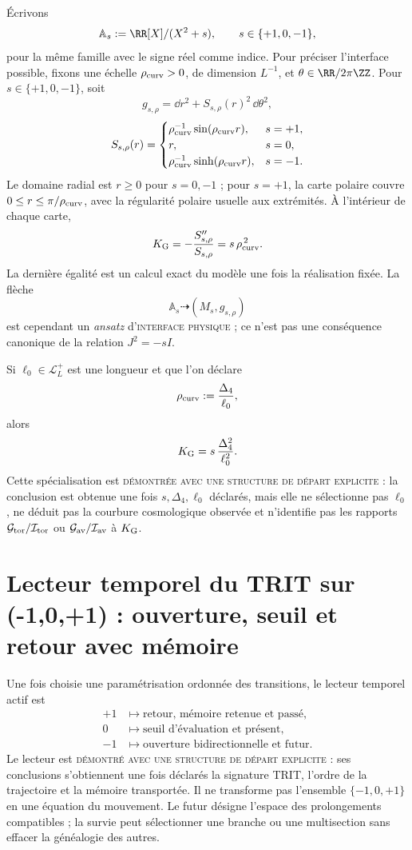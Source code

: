 Écrivons
\[
 \mathbb A_s:=\RR[X]/(X^2+s),
 \qquad s\in\{+1,0,-1\},
\]
pour la même famille avec le signe réel comme indice.
Pour préciser l'interface possible, fixons une échelle
\(\rho_{\rm curv}>0\), de dimension \(L^{-1}\), et
\(\theta\in\RR/2\pi\ZZ\). Pour \(s\in\{+1,0,-1\}\), soit
\[
 g_{s,\rho}
 =\dd r^2+S_{s,\rho}(r)^2\,\dd\theta^2,
\]
\[
 S_{s,\rho}(r)=
 \begin{cases}
  \rho_{\rm curv}^{-1}\sin(\rho_{\rm curv}r),&s=+1,\\
  r,&s=0,\\
  \rho_{\rm curv}^{-1}\sinh(\rho_{\rm curv}r),&s=-1.
 \end{cases}
\]
Le domaine radial est \(r\geq0\) pour \(s=0,-1\) ; pour \(s=+1\), la carte
polaire couvre \(0\leq r\leq\pi/\rho_{\rm curv}\), avec la régularité polaire
usuelle aux extrémités. À l'intérieur de chaque carte,
\[
 K_{\rm G}
 =-\frac{S_{s,\rho}''}{S_{s,\rho}}
 =s\,\rho_{\rm curv}^{\,2}.
\]
La dernière égalité est un calcul exact du modèle une fois la
réalisation fixée. La flèche
\[
 \mathbb A_s\dashrightarrow(M_s,g_{s,\rho})
\]
est cependant un \emph{ansatz} d'\textsc{interface physique} ; ce n'est pas une
conséquence canonique de la relation \(J^2=-sI\).

Si \(\ell_0\in\mathcal L_L^+\) est une longueur et que l'on déclare
\[
 \rho_{\rm curv}:=\frac{\Delta_4}{\ell_0},
\]
alors
\[
 K_{\rm G}
 =s\,\frac{\Delta_4^2}{\ell_0^2}.
\]
Cette spécialisation est
\textsc{démontrée avec une structure de départ explicite} : la conclusion est
obtenue une fois \(s,\Delta_4,\ell_0\) déclarés, mais elle ne sélectionne pas
\(\ell_0\), ne
déduit pas la courbure cosmologique observée et n'identifie pas les rapports
\(\mathcal G_{\rm tor}/\mathcal I_{\rm tor}\) ou
\(\mathcal G_{\rm av}/\mathcal I_{\rm av}\) à \(K_{\rm G}\).

\section{Lecteur temporel du TRIT sur ({-1,0,+1}) : ouverture, seuil et retour avec mémoire}
\label{sec:lector-temporal-trit}

Une fois choisie une paramétrisation ordonnée des transitions, le lecteur
temporel actif est
\[
\begin{aligned}
 +1&\longmapsto
 \text{retour, mémoire retenue et passé},\\
 0&\longmapsto
 \text{seuil d'évaluation et présent},\\
 -1&\longmapsto
 \text{ouverture bidirectionnelle et futur}.
\end{aligned}
\]
Le lecteur est \textsc{démontré avec une structure de départ explicite} : ses
conclusions s’obtiennent une fois déclarés la signature TRIT, l’ordre de la
trajectoire et la mémoire transportée. Il ne transforme pas l’ensemble
\(\{-1,0,+1\}\) en une équation du mouvement. Le futur désigne l’espace
des prolongements compatibles ; la survie peut sélectionner une branche
ou une multisection sans effacer la généalogie des autres.

